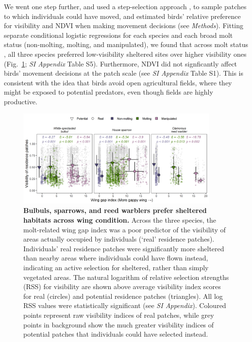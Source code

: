 \begin{refsection}
We went one step further, and used a step-selection approach \cite{signer2019,aben2021}, to sample patches to which individuals could have moved, and estimated birds' relative preference for visibility and NDVI when making movement decisions (see \textit{Methods}).
Fitting separate conditional logistic regressions for each species and each broad molt status (non-molting, molting, and manipulated), we found that across molt status , all three species preferred low-visibility sheltered sites over higher visibility ones (Fig.~\ref{fig_holey_04}; \textit{SI Appendix} Table S5).
Furthermore, NDVI did not signficantly affect birds' movement decisions at the patch scale (see \textit{SI Appendix} Table {S1}).
This is consistent with the idea that birds avoid open agricultural fields, where they might be exposed to potential predators, even though fields are highly productive.

\begin{figure}%
\centering
\includegraphics[width=0.9\textwidth]{figures/holeybirds/fig_04.png}
\caption{
    \textbf{Bulbuls, sparrows, and reed warblers prefer sheltered habitats across wing condition.}
    Across the three species, the molt-related wing gap index was a poor predictor of the visibility of areas actually occupied by individuals (`real' residence patches).
    Individuals' real residence patches were significantly more sheltered than nearby areas where individuals could have flown instead, indicating an active selection for sheltered, rather than simply vegetated areas.
    The natural logarithm of relative selection strengths (RSS) for visibility are shown above average visibility index scores for real (circles) and potential residence patches (triangles).
    All log RSS values were statistically significant (see \textit{SI Appendix}).
    Coloured points represent raw visibility indices of real patches, while grey points in background show the much greater visibility indices of potential patches that individuals could have selected instead.
}\label{fig_holey_04}
\end{figure}


\end{refsection}
